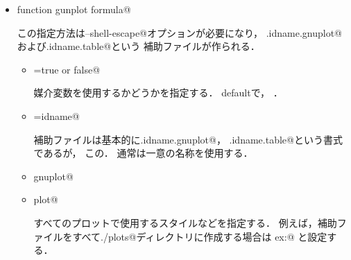 \documentclass[a4j,uplatex,dvipdfmx]{jsarticle}
\begin{document}
\begin{itemize}
\begin{verbatim}
	 \draw[->](-.2,0)--(4.2,0)node[xshift=-3pt,yshift=-4pt]{$x$};
	 \draw[->](0,-.2)--(0,4.2)node[xshift=-4pt,yshift=-3pt]{$y$};

	 \draw[color=red]plot(\x,\x)node[right]{$y=x$};
	 \draw[color=blue]plot(\x,{sin(\x r)})node[right]{$y=\sin x$};
	 \draw[color=orange]plot(\x,{exp(\x)*1/20})node[right]{$y=\Frac1{20}e^x$};

	 \draw[scale=0.5,domain=-3.1415:3.1415,smooth,variable=\t]
	  plot({\t*sin(\t r)},{\t*cos(\t r)})node[left]{$C$};
	\end{tikzpicture}
       \end{verbatim}
 \item {} function {gunplot formula}@

       この指定方法は\verb@--shell-escape@オプションが必要になり，
       \verb@\jobname.idname.gnuplot@および\verb@\jobname.idname.table@という
       補助ファイルが作られる．
       \begin{itemize}
	\item \verb@parametric=true or false@

	      媒介変数を使用するかどうかを指定する．
	      defaultで，
	      ．
	\item \verb@id=idname@

	      補助ファイルは基本的に\verb@\jobname.idname.gnuplot@，
	      \verb@\jobname.idname.table@という書式であるが，
	      この．
	      通常は一意の名称を使用する．
	\item \verb@row gnuplot@
	\item \verb@evry plot@

	      すべてのプロットで使用するスタイルなどを指定する．
	      例えば，補助ファイルをすべて\verb@./plots@ディレクトリに作成する場合は
	      ex:\verb@{}@
	      と設定する．
       \end{itemize}
\end{itemize}
\end{document}
